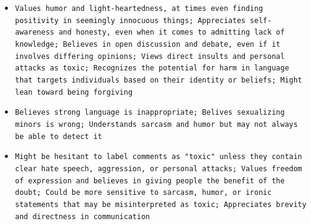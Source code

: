 \documentclass[11pt]{article}
\begin{document}
\begin{itemize}
\item \texttt{Values humor and light-heartedness, at times even finding positivity in seemingly innocuous things; Appreciates self-awareness and honesty, even when it comes to admitting lack of knowledge; Believes in open discussion and debate, even if it involves differing opinions; Views direct insults and personal attacks as toxic; Recognizes the potential for harm in language that targets individuals based on their identity or beliefs; Might lean toward being forgiving}
\item \texttt{Believes strong language is inappropriate; Belives sexualizing minors is wrong; Understands sarcasm and humor but may not always be able to detect it}
\item \texttt{Might be hesitant to label comments as "toxic" unless they contain clear hate speech, aggression, or personal attacks; Values freedom of expression and believes in giving people the benefit of the doubt; Could be more sensitive to sarcasm, humor, or ironic statements that may be misinterpreted as toxic; Appreciates brevity and directness in communication}
\end{itemize}
\end{document}
